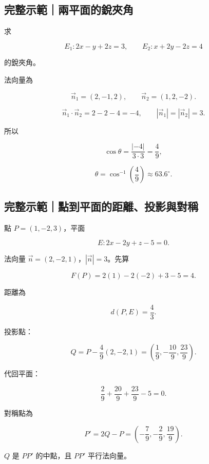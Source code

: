 \documentclass[11pt,a4paper]{article}
\begin{document}
\begin{HandoutWorkedExample}

\subsection{完整示範｜兩平面的銳夾角}\label{ux5b8cux6574ux793aux7bc4ux5169ux5e73ux9762ux7684ux92b3ux593eux89d2}

求

\[
E_1:2x-y+2z=3,
\qquad
E_2:x+2y-2z=4
\]

的銳夾角。

法向量為

\[
\vec n_1=(2,-1,2),
\qquad
\vec n_2=(1,2,-2).
\]

\[
\vec n_1\cdot\vec n_2=2-2-4=-4,
\qquad
|\vec n_1|=|\vec n_2|=3.
\]

所以

\[
\cos\theta=\frac{|-4|}{3\cdot3}=\frac49,
\]

\[
\boxed{\theta=\cos^{-1}\!\left(\frac49\right)\approx63.6^\circ}.
\]

\end{HandoutWorkedExample}

\begin{HandoutWorkedExample}

\subsection{完整示範｜點到平面的距離、投影與對稱}\label{ux5b8cux6574ux793aux7bc4ux9edeux5230ux5e73ux9762ux7684ux8dddux96e2ux6295ux5f71ux8207ux5c0dux7a31}

點 \(P=(1,-2,3)\)，平面

\[
E:2x-2y+z-5=0.
\]

法向量 \(\vec n=(2,-2,1)\)，\(|\vec n|=3\)。先算

\[
F(P)=2(1)-2(-2)+3-5=4.
\]

距離為

\[
\boxed{d(P,E)=\frac43}.
\]

投影點：

\[
Q=P-\frac4{9}(2,-2,1)
=\boxed{\left(\frac19,-\frac{10}{9},\frac{23}{9}\right)}.
\]

代回平面：

\[
\frac29+\frac{20}{9}+\frac{23}{9}-5=0.
\]

對稱點為

\[
P'=2Q-P
=\boxed{\left(-\frac79,-\frac29,\frac{19}{9}\right)}.
\]

\(Q\) 是 \(PP'\) 的中點，且 \(PP'\) 平行法向量。

\end{HandoutWorkedExample}
\end{document}
